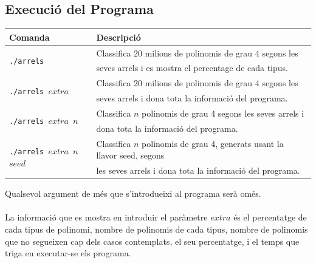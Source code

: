 \documentclass[a4paper, 11pt]{article}
\begin{document}
\subsection{Execució del Programa}

\begin{table}[h]
    \centering
    \begin{tabular}{l|l}
        \textbf{Comanda} & \textbf{Descripció} \\ \hline \hline 
        \multirow{2}{*}{\texttt{./arrels }} & Classifica 20 milions de polinomis de grau 4 segons les \\
        &  seves arrels i es mostra el percentage de cada tipus. \\\hline
        \multirow{2}{*}{\texttt{./arrels $extra$ }} & Classifica 20 milions de polinomis de grau 4 segons les\\
        & seves arrels i dona tota la informació del programa.\\\hline
        \multirow{2}{*}{\texttt{./arrels $extra$ $n$}}  & Classifica $n$ polinomis de grau 4 segons les seves arrels i\\
        & dona tota la informació del programa. \\\hline
        \multirow{2}{*}{\texttt{./arrels $extra$ $n$ $seed$}}  & Classifica $n$ polinomis de grau 4, generats usant la llavor seed, segons \\
        &les seves arrels i dona tota la informació del programa. \\
    \end{tabular}
    \label{tab:my_label}
\end{table}
\hspace{-1.5em}Qualsevol argument de més que s'introdueixi al programa serà omés.\\\\
La informació que es mostra en introduir el paràmetre $extra$ és el percentatge de cada tipus de polinomi, nombre de polinomis de cada tipus, nombre de polinomis que no segueixen cap dels casos contemplats, el seu percentatge, i el temps que triga en executar-se els programa.


\newpage
\end{document}
